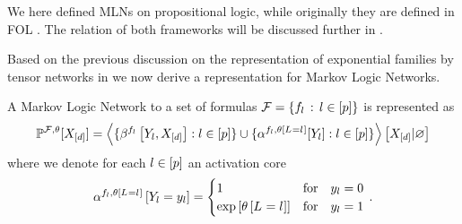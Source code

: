 \begin{remark}
    We here defined MLNs on propositional logic, while originally they are defined in FOL \cite{richardson_markov_2006}.
    The relation of both frameworks will be discussed further in .
\end{remark}




Based on the previous discussion on the representation of exponential families by tensor networks in  we now derive a representation for Markov Logic Networks.


\begin{theorem}
    \label{the:mlnTensorRep}
    A Markov Logic Network to a set of formulas $\mathcal{F} = \{f_{l} \, : \, l\in[p]\}$ is represented as
    \begin{align*}
        \mathbb{P}^{\mathcal{F},\theta}[X_{[d]}] =
        \left\langle \{\beta^{f_{l}}\left[Y_{l},X_{[d]}\right] : l\in[p] \} \cup \{\alpha^{f_{l},\theta\left[L_{}=l_{}\right]}[Y_{l}] : l\in[p] \}
        \right\rangle \left[ X_{[d]} | \varnothing \right]
    \end{align*}
    where we denote for each $l\in[p]$ an activation core
    \begin{align*}
        \alpha^{f_{l},\theta\left[L_{}=l_{}\right]}\left[Y_{l}=y_{l}\right]
        = \begin{cases}
              1 & \text{for} \quad y_{l} = 0 \\
              \mathrm{exp}\left[\theta\left[L_{}=l_{}\right]\right] & \text{for} \quad y_{l}  = 1
        \end{cases}  \, .
    \end{align*}
\end{theorem}
